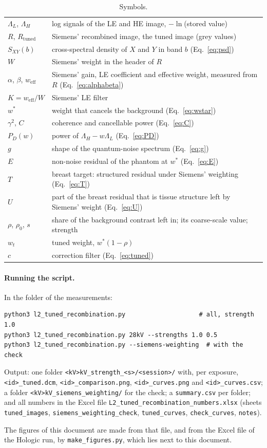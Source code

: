 \documentclass[11pt,a4paper]{article}
\newcommand{\LL}{\Lambda_L}
\newcommand{\LH}{\Lambda_H}
\newcommand{\weff}{w_\mathrm{eff}}
\newcommand{\ws}{w^{*}}
\newcommand{\wt}{w_t}
\newcommand{\code}[1]{\texttt{#1}}
\begin{document}
\begin{table}[H]\centering\small
\caption{Symbols.}
\begin{tabular}{ll}
\toprule
$\LL$, $\LH$ & log signals of the LE and HE image, $-\ln$(stored value) \\
$R$, $R_\mathrm{tuned}$ & Siemens' recombined image, the tuned image (grey values) \\
$S_{XY}(b)$ & cross-spectral density of $X$ and $Y$ in band $b$ (Eq.~\ref{eq:psd}) \\
$W$ & Siemens' weight in the header of $R$ \\
$\alpha$, $\beta$, $\weff$ & Siemens' gain, LE coefficient and effective weight, measured from $R$ (Eq.~\ref{eq:alphabeta}) \\
$K=\weff/W$ & Siemens' LE filter \\
$\ws$ & weight that cancels the background (Eq.~\ref{eq:wstar}) \\
$\gamma^2$, $C$ & coherence and cancellable power (Eq.~\ref{eq:C}) \\
$P_D(w)$ & power of $\LH-w\LL$ (Eq.~\ref{eq:PD}) \\
$g$ & shape of the quantum-noise spectrum (Eq.~\ref{eq:g}) \\
$E$ & non-noise residual of the phantom at $\ws$ (Eq.~\ref{eq:E}) \\
$T$ & breast target: structured residual under Siemens' weighting (Eq.~\ref{eq:T}) \\
$U$ & part of the breast residual that is tissue structure left by Siemens' weight (Eq.~\ref{eq:U}) \\
$\rho$, $\rho_0$, $s$ & share of the background contrast left in; its coarse-scale value; strength \\
$\wt$ & tuned weight, $\ws(1-\rho)$ \\
$c$ & correction filter (Eq.~\ref{eq:tuned}) \\
\bottomrule
\end{tabular}
\end{table}

\paragraph{Running the script.} In the folder of the measurements:
\begin{verbatim}
python3 l2_tuned_recombination.py                    # all, strength 1.0
python3 l2_tuned_recombination.py 28kV --strengths 1.0 0.5
python3 l2_tuned_recombination.py --siemens-weighting  # with the check
\end{verbatim}
{\sloppy Output: one folder \code{<kV>kV\_strength\_<s>/<session>/} with, per exposure, \code{<id>\_tuned.dcm},
\code{<id>\_comparison.png}, \code{<id>\_curves.png} and \code{<id>\_curves.csv}; a folder
\code{<kV>kV\_siemens\_weighting/} for the check; a \code{summary.csv} per folder; and all numbers in the Excel
file \code{L2\_tuned\_recombination\_numbers.xlsx} (sheets \code{tuned\_images}, \code{siemens\_weighting\_check},
\code{tuned\_curves}, \code{check\_curves}, \code{notes}).\par} The figures of this
document are made from that file, and from the Excel file of the Hologic run, by \code{make\_figures.py}, which lies
next to this document.
\end{document}
